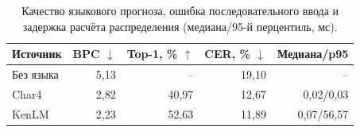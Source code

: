 \begin{table}[h]
\caption{Качество языкового прогноза, ошибка последовательного ввода и задержка расчёта распределения (медиана/95-й перцентиль, мс).}
\small\centering
\begin{tabular}{@{}lrrrr@{}}\toprule
Источник & BPC $\downarrow$ & Top-1, \% $\uparrow$ & CER, \% $\downarrow$ & Медиана/p95 \\\midrule
Без языка & 5,13 & -- & 19,10 & -- \\
Char4 & 2,82 & 40,97 & 12,67 & 0,02/0,03 \\
KenLM & 2,23 & 52,63 & 11,89 & 0,07/56,57 \\
\bottomrule\end{tabular}
\end{table}
